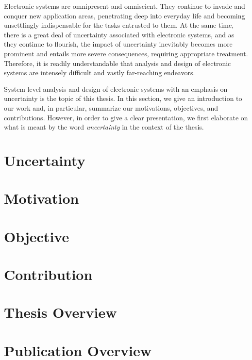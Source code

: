 Electronic systems are omnipresent and omniscient. They continue to invade and
conquer new application areas, penetrating deep into everyday life and becoming
unsettlingly indispensable for the tasks entrusted to them. At the same time,
there is a great deal of uncertainty associated with electronic systems, and as
they continue to flourish, the impact of uncertainty inevitably becomes more
prominent and entails more severe consequences, requiring appropriate treatment.
Therefore, it is readily understandable that analysis and design of electronic
systems are intensely difficult and vastly far-reaching endeavors.

System-level analysis and design of electronic systems with an emphasis on
uncertainty is the topic of this thesis. In this section, we give an
introduction to our work and, in particular, summarize our motivations,
objectives, and contributions. However, in order to give a clear presentation,
we first elaborate on what is meant by the word \emph{uncertainty} in the
context of the thesis.

\section{Uncertainty}

\section{Motivation}

\section{Objective}

\section{Contribution}

\section{\pasttitle}

\section{Thesis Overview}

\section{Publication Overview}
